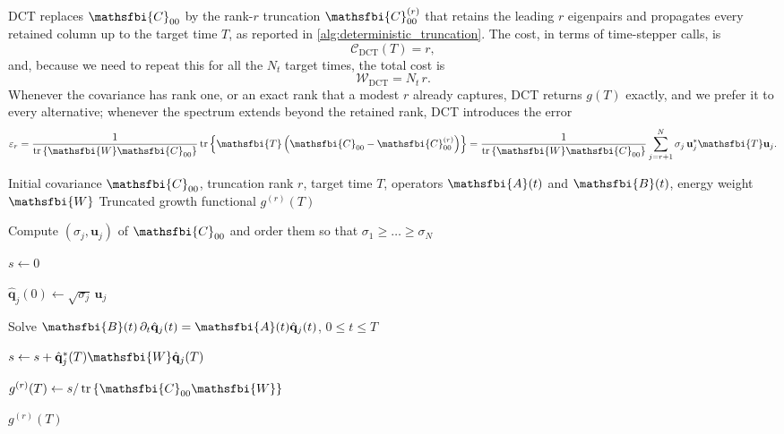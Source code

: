 DCT replaces \(\mathsfbi{C}_{00}\) by the rank-\(r\) truncation \(\mathsfbi{C}_{00}^{(r)}\) that
retains the leading \(r\) eigenpairs and propagates every retained column up to the target time
\(T\), as reported in \cref{alg:deterministic_truncation}. The cost, in terms of time-stepper
calls, is
\begin{equation}
  \mathcal{C}_{\mathrm{DCT}}(T)=r,
  \label{eq:deterministic_fixed_time_cost}
\end{equation}
and, because we need to repeat this for all the \(N_t\) target times, the total cost is
\begin{equation}
  \mathcal{W}_{\mathrm{DCT}}=N_t\,r.
  \label{eq:deterministic_history_cost}
\end{equation}
Whenever the covariance has rank one, or an exact rank that a modest \(r\) already captures, DCT
returns \(g(T)\) exactly, and we prefer it to every alternative; whenever the spectrum extends
beyond the retained rank, DCT introduces the error
\begin{equation}
  \varepsilon_r
  =
  \frac{1}{\tr\left\{\mathsfbi{W}\mathsfbi{C}_{00}\right\}}
  \tr
  \left\{
    \mathsfbi{T}
    \left(
      \mathsfbi{C}_{00}
      -
      \mathsfbi{C}_{00}^{(r)}
    \right)
  \right\}
  =
  \frac{1}{\tr\left\{\mathsfbi{W}\mathsfbi{C}_{00}\right\}}
  \sum_{j=r+1}^{N}
  \sigma_j\,
  \mathbf{u}_j^{*}\mathsfbi{T}\mathbf{u}_j.
  \label{eq:trace_error_1}
\end{equation}

\begin{algorithm}[H]
  \caption{Deterministic truncation (DCT) estimate of \(g(T)\)}
  \label{alg:deterministic_truncation}

  \begin{algorithmic}[1]
    \Require Initial covariance \(\mathsfbi{C}_{00}\), truncation rank \(r\),
             target time \(T\), operators \(\mathsfbi{A}(t)\) and \(\mathsfbi{B}(t)\),
             energy weight \(\mathsfbi{W}\)
    \Ensure Truncated growth functional \(g^{(r)}(T)\)

    \State Compute \((\sigma_j,\mathbf{u}_j)\) of \(\mathsfbi{C}_{00}\)
      and order them so that \(\sigma_1\geq\dots\geq\sigma_N\)

    \State \(s\gets0\)

      \State \(\hat{\mathbf{q}}_j(0)\gets\sqrt{\sigma_j}\,\mathbf{u}_j\)

      \State Solve
        \(\mathsfbi{B}(t)\,\partial_t\hat{\mathbf{q}}_j(t)
        =
        \mathsfbi{A}(t)\hat{\mathbf{q}}_j(t)\),
        \(0\leq t\leq T\)

      \State \(s\gets s+\hat{\mathbf{q}}_j^{*}(T)\mathsfbi{W}\hat{\mathbf{q}}_j(T)\)
    \EndFor

    \State \(g^{(r)}(T)\gets s/\tr\left\{\mathsfbi{C}_{00}\mathsfbi{W}\right\}\)

    \State \Return \(g^{(r)}(T)\)
  \end{algorithmic}
\end{algorithm}

